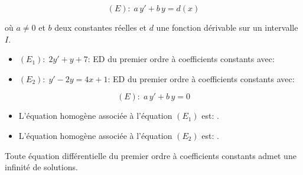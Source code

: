 \def\level{BTS}  %
\def\course{CIEL 2}
\def\chaptername{Equations différentielles} %
\def\docpart{Résolution ED du premier ordre à coefficients constants} %
\def\docname{C212}        %

\pagestyle{cours_FP}
\makeheaderBTS{} %

\begin{definition}{}
\[(E): \; a\, y' + b\, y = d(x)\]
	
où $a\neq 0$ et $b$ deux constantes réelles et $d$ une fonction dérivable sur un intervalle $I$.
\end{definition}

\begin{exemple}{}

	\begin{itemize}
		\item 	$(E_1):\; 2y'+y+7$: ED du premier ordre à coefficients constants avec: \hfill{}
		\item $(E_2):\; y'-2y=4x+1$: ED du premier ordre à coefficients constants avec: \hfill{}
	\end{itemize}
\end{exemple}

\medskip

\begin{definition}{}

\[(E): \; a\, y' + b\, y = 0\]
	
\end{definition}

	\begin{itemize}
		\item L'équation homogène associée à l'équation $(E_1)$ est: \hfill{}.
		\item L'équation homogène associée à l'équation $(E_2)$ est: \hfill{}.
	\end{itemize}

\begin{propriete}{}
Toute équation différentielle du premier ordre à coefficients constants admet une infinité de solutions.
\end{propriete}

